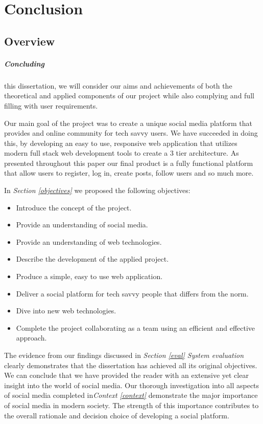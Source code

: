 
\chapter{Conclusion}
\section{Overview}
\paragraph{Concluding} this dissertation, we will consider our aims and achievements of both the theoretical and applied components of our project while also complying  and full filling with user requirements. 

Our main goal of the project was to create a unique social media platform that provides and online community for tech savvy users. We have succeeded in doing this, by developing an easy to use, responsive web application that utilizes modern full stack web development tools to create a 3 tier architecture. As presented throughout this paper our final product is a fully functional platform that allow users to register, log in, create posts, follow users and so much more.

In \textit{Section \ref{objectives}} we proposed the following objectives:
\begin{itemize}
    \item Introduce the concept of the project.
    \item Provide an understanding of social media.
    \item Provide an understanding of web technologies.
    \item Describe the development of the applied project.
    \item Produce a simple, easy to use web application.
    \item Deliver a social platform for tech savvy people that differs from the norm.
    \item Dive into new web technologies.
    \item Complete the project collaborating as a team using an efficient and effective approach.  
\end{itemize}

The evidence from our findings discussed in \textit{Section \ref{eval} System evaluation} clearly demonstrates that the dissertation has achieved all its original objectives. We can conclude that we have provided the reader with an extensive yet clear insight into the world of social media. Our thorough investigation into all aspects of social media completed in\textit{Context \ref{context}} demonstrate the major importance of social media in modern society. The strength of this importance contributes to the overall rationale and decision choice of developing a social platform. 

